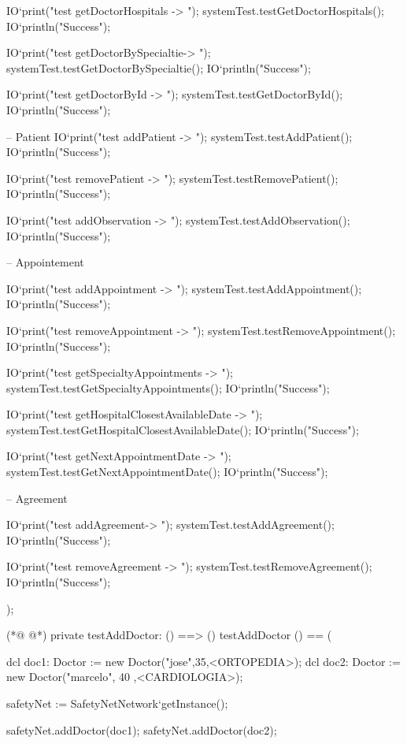 \begin{vdmpp}[breaklines=true]
  IO`print("test getDoctorHospitals -> ");
  systemTest.testGetDoctorHospitals();
  IO`println("Success");
  
  IO`print("test getDoctorBySpecialtie-> ");
  systemTest.testGetDoctorBySpecialtie();
  IO`println("Success");
  
  IO`print("test getDoctorById -> ");
  systemTest.testGetDoctorById();
  IO`println("Success");
  
  -- Patient
  IO`print("test addPatient -> ");
  systemTest.testAddPatient();
  IO`println("Success");
  
  IO`print("test removePatient -> ");
  systemTest.testRemovePatient();
  IO`println("Success");
  
  IO`print("test addObservation -> ");
  systemTest.testAddObservation();
  IO`println("Success");
  
  
  -- Appointement
  
  IO`print("test addAppointment -> ");
  systemTest.testAddAppointment();
  IO`println("Success");
    
  IO`print("test removeAppointment -> ");
  systemTest.testRemoveAppointment();
  IO`println("Success");
  
  IO`print("test getSpecialtyAppointments -> ");
  systemTest.testGetSpecialtyAppointments();
  IO`println("Success");
  
  IO`print("test getHospitalClosestAvailableDate -> ");
  systemTest.testGetHospitalClosestAvailableDate();
  IO`println("Success");
  
  IO`print("test getNextAppointmentDate -> ");
  systemTest.testGetNextAppointmentDate();
  IO`println("Success");
  
  -- Agreement
  
  IO`print("test addAgreement-> ");
  systemTest.testAddAgreement();
  IO`println("Success");
    
  IO`print("test removeAgreement -> ");
  systemTest.testRemoveAgreement();
  IO`println("Success");
   
);


(*@
\label{testAddDoctor:137}
@*)
private testAddDoctor: () ==> ()
 testAddDoctor () == (
 
  dcl doc1: Doctor := new Doctor("jose",35,<ORTOPEDIA>);
  dcl doc2: Doctor := new Doctor("marcelo", 40 ,<CARDIOLOGIA>);
  
  safetyNet := SafetyNetNetwork`getInstance();
   
  safetyNet.addDoctor(doc1);
  safetyNet.addDoctor(doc2);
  

\end{vdmpp}
